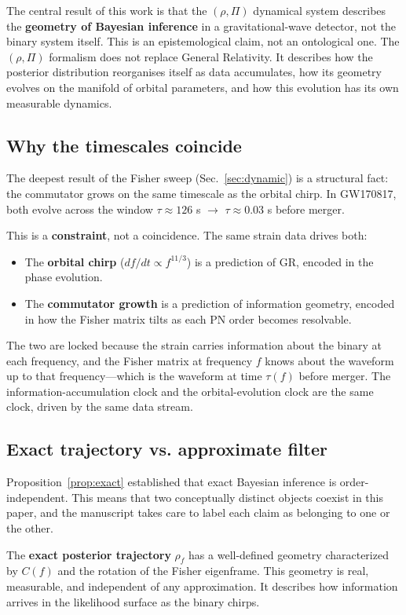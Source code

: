 \documentclass[twocolumn,prd,showpacs,superscriptaddress]{revtex4-2}
\begin{document}
The central result of this work is that the $(\rho, \Pi)$ dynamical system describes the \textbf{geometry of Bayesian inference} in a gravitational-wave detector, not the binary system itself. This is an epistemological claim, not an ontological one. The $(\rho, \Pi)$ formalism does not replace General Relativity. It describes how the posterior distribution reorganises itself as data accumulates, how its geometry evolves on the manifold of orbital parameters, and how this evolution has its own measurable dynamics.

\subsection{Why the timescales coincide}

The deepest result of the Fisher sweep (Sec.~\ref{sec:dynamic}) is a structural fact: the commutator grows on the same timescale as the orbital chirp. In GW170817, both evolve across the window $\tau \approx 126$ s $\rightarrow$ $\tau \approx 0.03$ s before merger.

This is a \textbf{constraint}, not a coincidence. The same strain data drives both:
\begin{itemize}
\item The \textbf{orbital chirp} ($df/dt \propto f^{11/3}$) is a prediction of GR, encoded in the phase evolution.
\item The \textbf{commutator growth} is a prediction of information geometry, encoded in how the Fisher matrix tilts as each PN order becomes resolvable.
\end{itemize}
The two are locked because the strain carries information about the binary at each frequency, and the Fisher matrix at frequency $f$ knows about the waveform up to that frequency---which is the waveform at time $\tau(f)$ before merger. The information-accumulation clock and the orbital-evolution clock are the same clock, driven by the same data stream.

\subsection{Exact trajectory vs. approximate filter}

Proposition~\ref{prop:exact} established that exact Bayesian inference is order-independent. This means that two conceptually distinct objects coexist in this paper, and the manuscript takes care to label each claim as belonging to one or the other.

The \textbf{exact posterior trajectory} $\rho_f$ has a well-defined geometry characterized by $C(f)$ and the rotation of the Fisher eigenframe. This geometry is real, measurable, and independent of any approximation. It describes how information arrives in the likelihood surface as the binary chirps.
\end{document}
